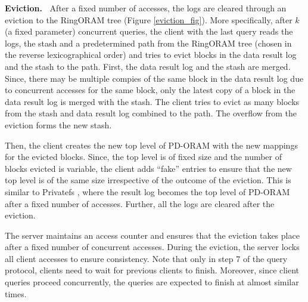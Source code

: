 {\bf Eviction.~}
After a fixed number of accesses, the logs are cleared through an eviction to the 
RingORAM tree (Figure \ref{eviction_fig}). 
More specifically, after $k$ (a fixed parameter) concurrent queries,  
the client with the last query reads the logs, the stash and a predetermined path 
from the RingORAM tree (chosen in the reverse lexicographical order) 
and tries to evict blocks in the data result log and the stash 
to the path. First, the data result log and the stash are merged. 
Since, there may be multiple compies of the same block in the data result log due to concurrent accesses for the same 
block, only the latest copy of a block in the data result log is merged with the stash. The client tries to 
evict as many blocks from the stash and data result log combined to the path.
The overflow from the eviction forms the new stash. 

Then, the client creates the new top level 
of PD-ORAM with the new mappings for the evicted blocks. Since, the top level is of fixed size and 
the number of blocks evicted is variable, the client adds ``fake'' entries to ensure that the new top level is 
of the same size irrespective of the outcome of the eviction.  This is similar to Privatefs \cite{privatefs}, 
where the result log becomes the top level of PD-ORAM after a fixed number of accesses. Further, all the logs are cleared after the eviction.

The server maintains an access counter and ensures that the eviction takes place after a fixed number of concurrent accesses. During the eviction, 
the server locks all client accesses to ensure consistency. Note that only in step 7 of the query protocol, clients need to wait for previous clients to 
finish. Moreover, since client queries proceed concurrently, the queries are expected to finish at almost similar times. 



